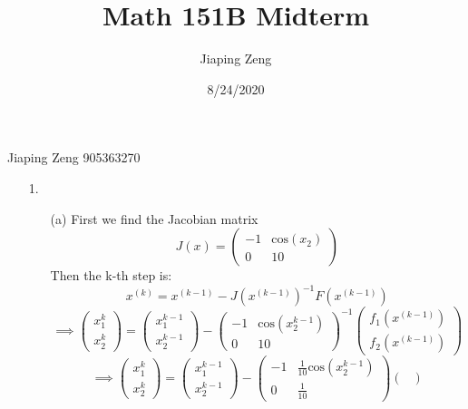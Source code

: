 \documentclass{article}
\title{Math 151B Midterm}
\author{Jiaping Zeng}
\date{8/24/2020}
\begin{document}

Jiaping Zeng 905363270

\newpage
\begin{itemize}
    \item [1.]
          \begin{itemize}
              \item [(a)] First we find the Jacobian matrix
                    \[J(x)=\begin{pmatrix}
                            -1 & \text{cos}(x_2) \\
                            0  & 10
                        \end{pmatrix}\]
                    Then the k-th step is:
                    \[x^{(k)}=x^{(k-1)}-J(x^{(k-1)})^{-1}F(x^{(k-1)})\]
                    \[\implies\begin{pmatrix}
                            x_1^k \\x_2^k
                        \end{pmatrix}=\begin{pmatrix}
                            x_1^{k-1} \\x_2^{k-1}
                        \end{pmatrix}-\begin{pmatrix}
                            -1 & \text{cos}(x_2^{k-1}) \\
                            0  & 10
                        \end{pmatrix}^{-1}\begin{pmatrix}
                            f_1(x^{(k-1)}) \\
                            f_2(x^{(k-1)})
                        \end{pmatrix}\]
                    \[\implies\begin{pmatrix}
                            x_1^k \\x_2^k
                        \end{pmatrix}=\begin{pmatrix}
                            x_1^{k-1} \\x_2^{k-1}
                        \end{pmatrix}-\begin{pmatrix}
                            -1 & \frac{1}{10}\text{cos}(x_2^{k-1}) \\
                            0  & \frac{1}{10}
                        \end{pmatrix}\begin{pmatrix}

\end{pmatrix}\]
\end{itemize}
\end{itemize}
\end{document}
